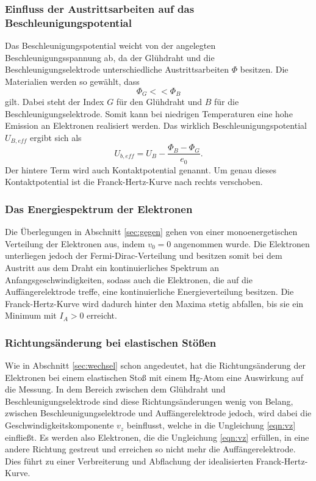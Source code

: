 \subsubsection*{Einfluss der Austrittsarbeiten auf das Beschleunigungspotential}
Das Beschleunigungspotential weicht von der angelegten Beschleunigungsspannung ab, da der Glühdraht und die Beschleunigungselektrode 
unterschiedliche Austrittsarbeiten $\Phi$ besitzen. Die Materialien werden so gewählt, dass 
\begin{equation*}
    \Phi_G<<\Phi_B    
\end{equation*}
gilt. Dabei steht der Index $G$ für den Glühdraht und $B$ für die Beschleunigungselektrode. Somit kann bei niedrigen 
Temperaturen eine hohe Emission an Elektronen realisiert werden. Das wirklich Beschleunigungspotential $U_{B,eff}$ ergibt sich als 
\begin{equation*}
    U_{b,eff}=U_B-\frac{\Phi_B-\Phi_G}{e_0} .
\end{equation*}
Der hintere Term wird auch Kontaktpotential genannt. Um genau dieses Kontaktpotential ist die Franck-Hertz-Kurve nach rechts verschoben.

\subsubsection*{Das Energiespektrum der Elektronen}
Die Überlegungen in Abschnitt \ref{sec:gegen} gehen von einer monoenergetischen Verteilung der Elektronen aus, indem $v_0=0$ angenommen 
wurde. Die Elektronen unterliegen jedoch der Fermi-Dirac-Verteilung und besitzen somit bei dem Austritt aus dem Draht ein kontinuierliches
Spektrum an Anfangsgeschwindigkeiten, sodass auch die Elektronen, die auf die Auffängerelektrode treffe, eine kontinuierliche Energieverteilung
besitzen. Die Franck-Hertz-Kurve wird dadurch hinter den Maxima stetig abfallen, bis sie ein Minimum mit $I_A>0$ erreicht.

\subsubsection*{Richtungsänderung bei elastischen Stößen}
Wie in Abschnitt \ref{sec:wechsel} schon angedeutet, hat die Richtungsänderung der Elektronen bei einem elastischen Stoß mit einem Hg-Atom
eine Auswirkung auf die Messung. In dem Bereich zwischen dem Glühdraht und Beschleunigungselektrode sind diese Richtungsänderungen 
wenig von Belang, zwischen Beschleunigungselektrode und Auffängerelektrode jedoch, wird dabei die Geschwindigkeitskomponente $v_z$ beinflusst,
welche in die Ungleichung \eqref{eqn:vz} einfließt. Es werden also Elektronen, die die Ungleichung \eqref{eqn:vz} erfüllen, in eine andere
Richtung gestreut und erreichen so nicht mehr die Auffängerelektrode. Dies führt zu einer Verbreiterung und Abflachung der idealisierten
Franck-Hertz-Kurve.

